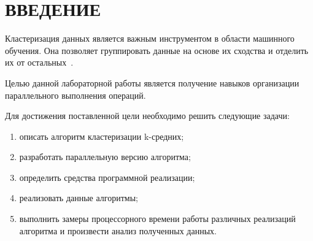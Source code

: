\chapter*{ВВЕДЕНИЕ}

Кластеризация данных является важным инструментом в области машинного обучения.
Она позволяет группировать данные на основе их сходства и отделить их от остальных~\cite{inro-clust}. 

Целью данной лабораторной работы является получение навыков организации параллельного выполнения операций.

Для достижения поставленной цели необходимо решить следующие задачи:
\begin{enumerate}[label={\arabic*)}]
    \item описать алгоритм кластеризации k-средних;
    \item разработать параллельную версию алгоритма;
    \item определить средства программной реализации;
    \item реализовать данные алгоритмы;
    \item выполнить замеры процессорного времени работы различных реализаций алгоритма и произвести анализ полученных данных.
\end{enumerate}